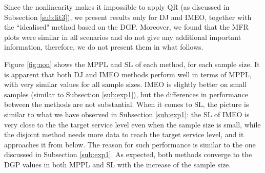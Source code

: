 \documentclass[a4paper,11pt]{article}
\begin{document}
Since the nonlinearity makes it impossible to apply QR (as discussed in Subsection \ref{sub:lit3}), we present results only for DJ and IMEO, together with the ``idealised" method based on the DGP. Moreover, we found that the MFR plots were similar in all scenarios and do not give any additional important information, therefore, we do not present them in what follows.

Figure \ref{fig:non} shows the MPPL and SL of each method, for each sample size. It is apparent that both DJ and IMEO methods perform well in terms of MPPL, with very similar values for all sample sizes. IMEO is slightly better on small samples (similar to Subsection \ref{sub:exp1}), but the differences in performance between the methods are not substantial. When it comes to SL, the picture is similar to what we have observed in Subsection \ref{sub:exp1}: the SL of IMEO is very close to the the target service level even when the sample size is small, while the disjoint method needs more data to reach the target service level, and it approaches it from below. The reason for such performance is similar to the one discussed in Subsection \ref{sub:exp1}. As expected, both methods converge to the DGP values in both MPPL and SL with the increase of the sample size.
\end{document}
